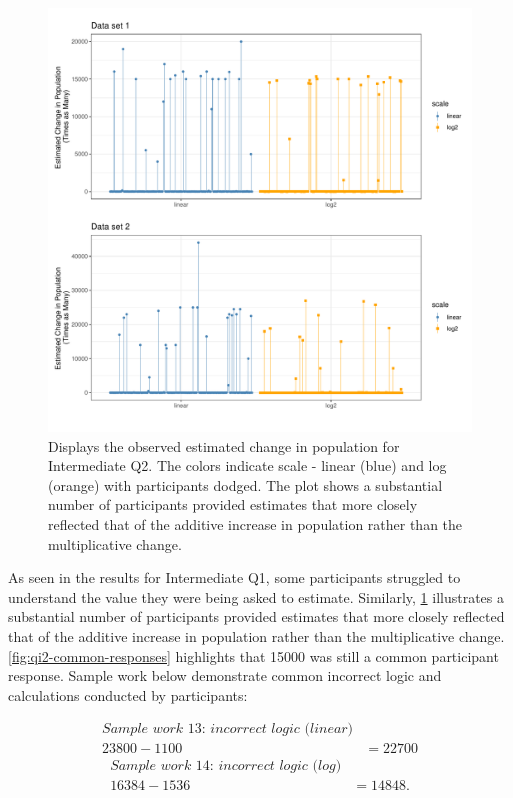 \documentclass[print]{nuthesis}
\begin{document}
\begin{figure}[tbp]

{\centering \includegraphics[width=1\linewidth,]{thesis_files/figure-latex/qi2-plots-1} 

}

\caption[Intermediate Q2 observed plot]{Displays the observed estimated change in population for Intermediate Q2. The colors indicate scale - linear (blue) and log (orange) with participants dodged. The plot shows a substantial number of participants provided estimates that more closely reflected that of the additive increase in population rather than the multiplicative change.}\label{fig:qi2-plots}
\end{figure}

As seen in the results for Intermediate Q1, some participants struggled to understand the value they were being asked to estimate.
Similarly, \cref{fig:qi2-plots} illustrates a substantial number of participants provided estimates that more closely reflected that of the additive increase in population rather than the multiplicative change.
\cref{fig:qi2-common-responses} highlights that 15000 was still a common participant response.
Sample work below demonstrate common incorrect logic and calculations conducted by participants:

\begin{align}
\textit{Sample work 13: incorrect logic (linear)} \nonumber\\
23800-1100&=22700 \nonumber
\end{align}
\begin{align}
\textit{Sample work 14: incorrect logic (log)} \nonumber\\
16384-1536&=14848. \nonumber
\end{align}
\end{document}
